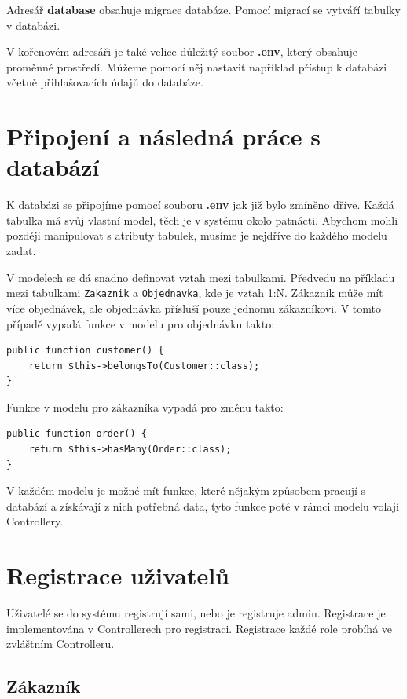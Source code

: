 Adresář \textbf{database} obsahuje migrace databáze. Pomocí migrací se vytváří tabulky v databázi.

V kořenovém adresáři je také velice důležitý soubor \textbf{.env}, který obsahuje proměnné prostředí. Můžeme pomocí něj nastavit například přístup k databázi včetně přihlašovacích údajů do databáze.


\section{Připojení a následná práce s databází}

K databázi se připojíme pomocí souboru \textbf{.env} jak již bylo zmíněno dříve. Každá tabulka má svůj vlastní model, těch je v systému okolo patnácti. Abychom mohli později manipulovat s atributy tabulek, musíme je nejdříve do každého modelu zadat.

V modelech se dá snadno definovat vztah mezi tabulkami. Předvedu na příkladu mezi tabulkami \texttt{Zakaznik} a \texttt{Objednavka}, kde je vztah 1:N. Zákazník může mít více objednávek, ale objednávka přísluší pouze jednomu zákazníkovi. V tomto případě vypadá funkce v modelu pro objednávku takto:

\begin{verbatim}
public function customer() { 
    return $this->belongsTo(Customer::class); 
}  
\end{verbatim}


\noindent Funkce v modelu pro zákazníka vypadá pro změnu takto:

\begin{verbatim}
public function order() {
    return $this->hasMany(Order::class);
}
\end{verbatim}



V každém modelu je možné mít funkce, které nějakým způsobem pracují s databází a získávají z nich potřebná data, tyto funkce poté v rámci modelu volají Controllery.


\section{Registrace uživatelů}

Uživatelé se do systému registrují sami, nebo je registruje admin. Registrace je implementována v Controllerech pro registraci. Registrace každé role probíhá ve zvláštním Controlleru.

\subsection{Zákazník}

